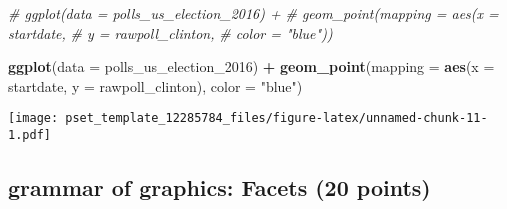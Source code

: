 \documentclass[
]{article}
\newenvironment{Shaded}{\begin{snugshade}}{\end{snugshade}}
\newcommand{\CommentTok}[1]{\textcolor[rgb]{0.56,0.35,0.01}{\textit{#1}}}
\newcommand{\DataTypeTok}[1]{\textcolor[rgb]{0.13,0.29,0.53}{#1}}
\newcommand{\DecValTok}[1]{\textcolor[rgb]{0.00,0.00,0.81}{#1}}
\newcommand{\KeywordTok}[1]{\textcolor[rgb]{0.13,0.29,0.53}{\textbf{#1}}}
\newcommand{\NormalTok}[1]{#1}
\newcommand{\OperatorTok}[1]{\textcolor[rgb]{0.81,0.36,0.00}{\textbf{#1}}}
\newcommand{\StringTok}[1]{\textcolor[rgb]{0.31,0.60,0.02}{#1}}
\begin{document}
\begin{enumerate}
\begin{Shaded}
\begin{Highlighting}[]
\CommentTok{# ggplot(data = polls_us_election_2016) + }
\CommentTok{#  geom_point(mapping = aes(x = startdate, }
\CommentTok{#                           y = rawpoll_clinton, }
\CommentTok{#                           color = "blue"))}

\KeywordTok{ggplot}\NormalTok{(}\DataTypeTok{data =}\NormalTok{ polls_us_election_}\DecValTok{2016}\NormalTok{) }\OperatorTok{+}\StringTok{ }
\StringTok{  }\KeywordTok{geom_point}\NormalTok{(}\DataTypeTok{mapping =} \KeywordTok{aes}\NormalTok{(}\DataTypeTok{x =}\NormalTok{ startdate, }
                           \DataTypeTok{y =}\NormalTok{ rawpoll_clinton),}
                           \DataTypeTok{color =} \StringTok{"blue"}\NormalTok{)}
\end{Highlighting}
\end{Shaded}

  \texttt{[image: pset\_template\_12285784\_files/figure-latex/unnamed-chunk-11-1.pdf]}
\end{enumerate}

\hypertarget{grammar-of-graphics-facets-20-points}{%
\subsection{grammar of graphics: Facets (20
points)}\label{grammar-of-graphics-facets-20-points}}
\end{document}
